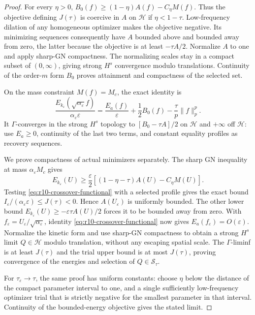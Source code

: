 \begin{proof}
For every $\eta>0$,
$B_0(f)\ge(1-\eta)A(f)-C_\eta M(f)$. Thus the objective defining
$J(\tau)$ is coercive in $A$ on $\mathcal H$ if $\eta<1-\tau$.
Low-frequency dilation of any homogeneous optimizer makes the
objective negative. Its minimizing sequences consequently have $A$
bounded above and bounded away from zero, the latter because the
objective is at least $-\tau A/2$. Normalize $A$ to one and apply
sharp-GN compactness. The normalizing scales stay in a compact subset
of $(0,\infty)$, giving strong $H^s$ convergence modulo translations.
Continuity of the order-$m$ form $B_0$ proves attainment and compactness
of the selected set.

On the mass constraint $M(f)=M_c$, the exact identity is
\begin{equation}\label{eq:r10-crossover-functional}
 \frac{E_{k_\varepsilon}(\sqrt{\alpha_\varepsilon}f)}
             {\alpha_\varepsilon\varepsilon}
 =\frac{E_a(f)}\varepsilon+\frac12B_0(f)
                              -\frac\tau p\|f\|_p^p.
\end{equation}
It $\Gamma$-converges in the strong $H^s$ topology to
$[B_0-\tau A]/2$ on $\mathcal H$ and $+\infty$ off $\mathcal H$:
use $E_a\ge0$, continuity of the last two terms, and constant equality
profiles as recovery sequences.

We prove compactness of actual minimizers separately. The sharp GN
inequality at mass $\alpha_\varepsilon M_c$ gives
\[
 E_{k_\varepsilon}(U)
 \ge\frac\varepsilon2
       [(1-\eta-\tau)A(U)-C_\eta M(U)].
\]
Testing \eqref{eq:r10-crossover-functional} with a selected profile
gives the exact bound
$I_\varepsilon/(\alpha_\varepsilon\varepsilon)\le J(\tau)<0$.
Hence $A(U_\varepsilon)$ is uniformly bounded. The other lower bound
$E_{k_\varepsilon}(U)\ge-\varepsilon\tau A(U)/2$ forces it to be
bounded away from zero. With
$f_\varepsilon=U_\varepsilon/\sqrt{\alpha_\varepsilon}$, identity
\eqref{eq:r10-crossover-functional} now gives
$E_a(f_\varepsilon)=O(\varepsilon)$. Normalize the kinetic form and
use sharp-GN compactness to obtain a strong $H^s$ limit
$Q\in\mathcal H$ modulo translation, without any escaping spatial
scale. The $\Gamma$-liminf is at least $J(\tau)$ and the trial upper
bound is at most $J(\tau)$, proving convergence of the energies and
selection of $Q\in\mathcal S_\tau$.

For $\tau_\varepsilon\to\tau$, the same proof has uniform constants:
choose $\eta$ below the distance of the compact parameter interval to
one, and a single sufficiently low-frequency optimizer trial that is
strictly negative for the smallest parameter in that interval.
Continuity of the bounded-energy objective gives the stated limit.
\end{proof}

